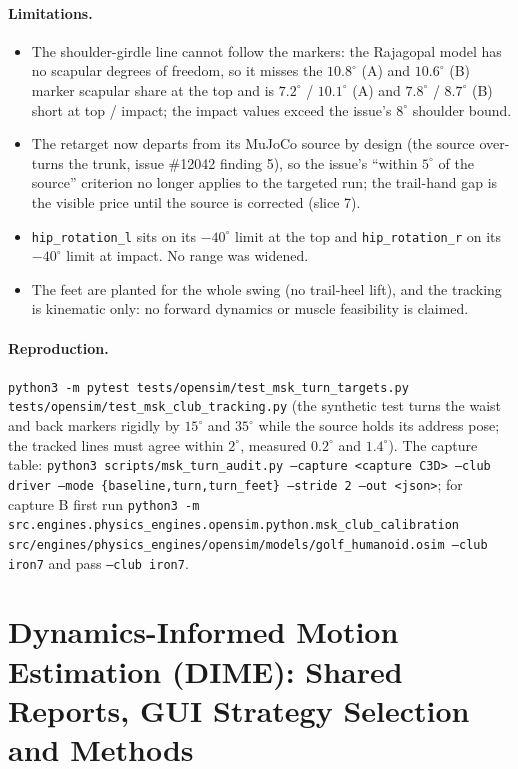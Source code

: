\documentclass[11pt,a4paper]{article}
\begin{document}
\paragraph{Limitations.}
\begin{itemize}
\item The shoulder-girdle line cannot follow the markers: the Rajagopal model
  has no scapular degrees of freedom, so it misses the $10.8^\circ$ (A) and
  $10.6^\circ$ (B) marker scapular share at the top and is $7.2^\circ$ /
  $10.1^\circ$ (A) and $7.8^\circ$ / $8.7^\circ$ (B) short at top / impact;
  the impact values exceed the issue's $8^\circ$ shoulder bound.
\item The retarget now departs from its MuJoCo source by design (the source
  over-turns the trunk, issue \#12042 finding 5), so the issue's ``within
  $5^\circ$ of the source'' criterion no longer applies to the targeted run;
  the trail-hand gap is the visible price until the source is corrected
  (slice 7).
\item \texttt{hip\_rotation\_l} sits on its $-40^\circ$ limit at the top and
  \texttt{hip\_rotation\_r} on its $-40^\circ$ limit at impact. No range was
  widened.
\item The feet are planted for the whole swing (no trail-heel lift), and the
  tracking is kinematic only: no forward dynamics or muscle feasibility is
  claimed.
\end{itemize}

\paragraph{Reproduction.}
\texttt{python3 -m pytest tests/opensim/test\_msk\_turn\_targets.py
tests/opensim/test\_msk\_club\_tracking.py} (the synthetic test turns the
waist and back markers rigidly by $15^\circ$ and $35^\circ$ while the source
holds its address pose; the tracked lines must agree within $2^\circ$,
measured $0.2^\circ$ and $1.4^\circ$). The capture table:
\texttt{python3 scripts/msk\_turn\_audit.py --capture <capture C3D> --club
driver --mode \{baseline,turn,turn\_feet\} --stride 2 --out <json>}; for
capture B first run
\texttt{python3 -m src.engines.physics\_engines.opensim.python.msk\_club\_calibration
src/engines/physics\_engines/opensim/models/golf\_humanoid.osim --club iron7}
and pass \texttt{--club iron7}.

\section{Dynamics-Informed Motion Estimation (DIME): Shared Reports, GUI Strategy Selection and Methods}
\label{sec:dime_reports_methods}
\end{document}
